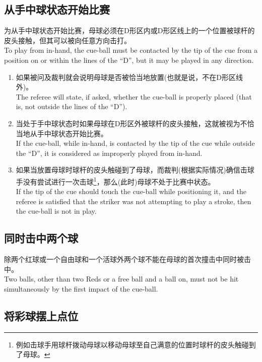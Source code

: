 \subsection{从手中球状态开始比赛}

\noindent 为从手中球状态开始比赛，母球必须在D形区内或D形区线上的一个位置被球杆的皮头接触，但其可以被向任意方向击打。\\
To play from in-hand, the cue-ball must be contacted by the tip 
of the cue from a position on or within the lines of the “D”, but it 
may be played in any direction.
\begin{enumerate}[label=(\alph*)]
    \item 如果被问及裁判就会说明母球是否被恰当地放置(也就是说，不在D形区线外)。\\
    The referee will state, if asked, whether the cue-ball is properly placed (that is, not outside the lines of the ``D'').
    \item 当处于手中球状态时如果母球在D形区外被球杆的皮头接触，这就被视为不恰当地从手中球状态开始比赛。\\
    If the cue-ball, while in-hand, is contacted by the tip of the cue while outside the ``D'', it is considered as improperly played from in-hand.
    \item 如果当放置母球时球杆的皮头触碰到了母球，而裁判(根据实际情况)确信击球手没有尝试进行一次击球\footnote{例如击球手用球杆拨动母球以移动母球至自己满意的位置时球杆的皮头触碰到了母球。}，那么(此时)母球不处于比赛中状态。\\
    If the tip of the cue should touch the cue-ball while positioning it, and the referee is satisfied that the striker was not attempting to play a stroke, then the cue-ball is not in play.
\end{enumerate}

\subsection{同时击中两个球}

\noindent 除两个红球或一个自由球和一个活球外两个球不能在母球的首次撞击中同时被击中。\\
Two balls, other than two Reds or a free ball and a ball on, must 
not be hit simultaneously by the first impact of the cue-ball.

\subsection{将彩球摆上点位}\label{2237}


